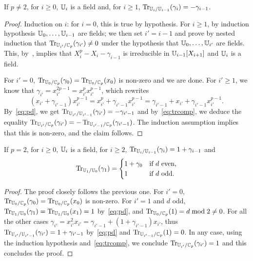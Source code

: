 \begin{lemma}
  \label{coro:trace}
  If $p\ne2$, for $i \ge 0$, $\mathbb{U}_i$ is a field and, for $i\ge1$,
  $\operatorname{Tr}_{\mathbb{U}_i/\mathbb{U}_{i-1}}(\gamma_i) = -\gamma_{i-1}$.
\end{lemma}
\begin{proof} Induction on $i$: for $i=0$, this is true by hypothesis. For
$i \ge 1$, by induction hypothesis $\mathbb{U}_0,\ldots,\mathbb{U}_{i-1}$ are fields;
we then set $i'=i-1$ and prove by nested induction that
$\operatorname{Tr}_{\mathbb{U}_{i'}/\mathbb{C}_p}(\gamma_{i'})\ne 0$ under the hypothesis that
$\mathbb{U}_0,\ldots,\mathbb{U}_{i'}$ are fields. This, by~\cite[Th.~2.25]{LN},
implies that $X_i^p-X_i-\gamma_{i-1}$ is irreducible in
$\mathbb{U}_{i-1}[X_{i+1}]$ and $\mathbb{U}_i$ is a field.

For $i'=0$, $\operatorname{Tr}_{\mathbb{U}_0/\mathbb{C}_p}(\gamma_0)=\operatorname{Tr}_{\mathbb{U}_0/\mathbb{C}_p}(x_0)$ is
non-zero and we are done.  For $i' \ge 1$, we know that
$\gamma_{i'}=x_{i'}^{2p-1}=x_{i'}^px_{i'}^{p-1}$, which rewrites
 \begin{equation*}
(x_{i'}+\gamma_{i'-1})x_{i'}^{p-1} = x_{i'}^p +\gamma_{i'-1} x_{i'}^{p-1}
 = \gamma_{i'-1} + x_{i'} +\gamma_{i'-1} x_{i'}^{p-1}.
\end{equation*}
By~\ref{eq:pd}, we get $\operatorname{Tr}_{\mathbb{U}_{i'}/\mathbb{U}_{i'-1}}(\gamma_{i'}) =
-\gamma_{i'-1}$ and by~\ref{eq:trcomp}, we deduce the equality
$\operatorname{Tr}_{\mathbb{U}_{i'}/\mathbb{C}_p}(\gamma_{i'})=-\operatorname{Tr}_{\mathbb{U}_{i'-1}/\mathbb{C}_p}(\gamma_{i'-1})$. The
induction assumption implies that this is non-zero, and the claim
follows. \end{proof}

\begin{lemma}
  If $p=2$, for $i \ge 0$, $\mathbb{U}_i$ is a field, for $i\ge2$,
  $\operatorname{Tr}_{\mathbb{U}_i/\mathbb{U}_{i-1}}(\gamma_i) = 1+\gamma_{i-1}$ and 
  \begin{equation*}
    \operatorname{Tr}_{\mathbb{U}_1/\mathbb{U}_0}(\gamma_1) = \begin{cases}
      1+\gamma_0 &\text{if $d$ even,}\\
      1          &\text{if $d$ odd.}
    \end{cases}
  \end{equation*}
\end{lemma}
\begin{proof} The proof closely follows the previous one. For $i'=0$,
$\operatorname{Tr}_{\mathbb{U}_0/\mathbb{C}_p}(\gamma_0)=\operatorname{Tr}_{\mathbb{U}_0/\mathbb{C}_p}(x_0)$ is non-zero.  For
$i'=1$ and $d$ odd, $\operatorname{Tr}_{\mathbb{U}_1/\mathbb{U}_0}(\gamma_1)=\operatorname{Tr}_{\mathbb{U}_1/\mathbb{U}_0}(x_1) =
1$ by~\ref{eq:pd}, and $\operatorname{Tr}_{\mathbb{U}_0/\mathbb{C}_p}(1) = d\bmod 2\ne0$. For all
the other cases $\gamma_{i'}=x_{i'}^2x_{i'}=\gamma_{i'-1} +
(1+\gamma_{i'-1})x_{i'}$, thus
$\operatorname{Tr}_{\mathbb{U}_{i'}/\mathbb{U}_{i'-1}}(\gamma_{i'})=1+\gamma_{i'-1}$ by~\ref{eq:pd}
and $\operatorname{Tr}_{\mathbb{U}_{i'-1}/\mathbb{C}_p}(1) = 0$. In any case, using the induction
hypothesis and~\ref{eq:trcomp}, we conclude
$\operatorname{Tr}_{\mathbb{U}_{i'}/\mathbb{C}_p}(\gamma_{i'}) = 1$ and this concludes the
proof.\end{proof}


